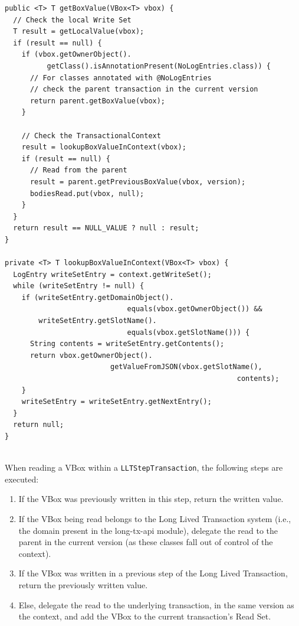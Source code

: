 \begin{lstlisting}[caption={Reading a VBox within a Context}]
public <T> T getBoxValue(VBox<T> vbox) {
  // Check the local Write Set
  T result = getLocalValue(vbox);
  if (result == null) {
    if (vbox.getOwnerObject().
          getClass().isAnnotationPresent(NoLogEntries.class)) {
      // For classes annotated with @NoLogEntries
      // check the parent transaction in the current version
      return parent.getBoxValue(vbox);
    }

    // Check the TransactionalContext
    result = lookupBoxValueInContext(vbox);
    if (result == null) {
      // Read from the parent
      result = parent.getPreviousBoxValue(vbox, version);
      bodiesRead.put(vbox, null);
    }
  }
  return result == NULL_VALUE ? null : result;
}

private <T> T lookupBoxValueInContext(VBox<T> vbox) {
  LogEntry writeSetEntry = context.getWriteSet();
  while (writeSetEntry != null) {
    if (writeSetEntry.getDomainObject().
                             equals(vbox.getOwnerObject()) &&
        writeSetEntry.getSlotName().
                             equals(vbox.getSlotName())) {
      String contents = writeSetEntry.getContents();
      return vbox.getOwnerObject().
                         getValueFromJSON(vbox.getSlotName(),
                                                       contents);
    }
    writeSetEntry = writeSetEntry.getNextEntry();
  }
  return null;
}


\end{lstlisting}

When reading a VBox within a \texttt{LLTStepTransaction}, the following
steps are executed:

\begin{enumerate}

\item If the VBox was previously written in this step, return the
  written value.

\item If the VBox being read belongs to the Long Lived Transaction
  system (i.e., the domain present in the long-tx-api module),
  delegate the read to the parent in the current version (as these
  classes fall out of control of the context).

\item If the VBox was written in a previous step of the Long Lived
  Transaction, return the previously written value.

\item Else, delegate the read to the underlying transaction, in the
  same version as the context, and add the VBox to the current
  transaction's Read Set.

\end{enumerate}

